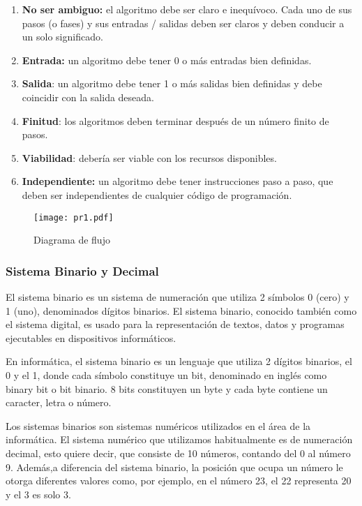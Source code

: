\begin{enumerate}
    \item \textbf{No ser ambiguo:} el algoritmo debe ser claro e inequívoco. Cada uno de sus pasos (o fases) y sus entradas / salidas deben ser claros y deben conducir a un solo significado.

    \item \textbf{Entrada:} un algoritmo debe tener 0 o más entradas bien definidas.

    \item \textbf{Salida}: un algoritmo debe tener 1 o más salidas bien definidas y debe coincidir con la salida deseada.

    \item \textbf{Finitud}: los algoritmos deben terminar después de un número finito de pasos.

    \item \textbf{Viabilidad}: debería ser viable con los recursos disponibles.

    \item \textbf{Independiente:} un algoritmo debe tener instrucciones paso a paso, que deben ser independientes de cualquier código de programación.
\end{enumerate}

\begin{figure}[h!]
\centering
  \texttt{[image: pr1.pdf]}
  \caption{Diagrama de flujo}
\end{figure}

\subsubsection{Sistema Binario y Decimal}

El sistema binario es un sistema de numeración que utiliza 2 símbolos 0 (cero) y 1 (uno), denominados dígitos binarios. El sistema binario, conocido también como el sistema digital, es usado para la representación de textos, datos y programas ejecutables en dispositivos informáticos.

En informática, el sistema binario es un lenguaje que utiliza 2 dígitos binarios, el 0 y el 1, donde cada símbolo constituye un bit, denominado en inglés como binary bit o bit binario. 8 bits constituyen un byte y cada byte contiene un caracter, letra o número.

Los sistemas binarios son sistemas numéricos utilizados en el área de la informática. El sistema numérico que utilizamos habitualmente es de numeración decimal, esto quiere decir, que consiste de 10 números, contando del 0 al número 9. Además,a diferencia del sistema binario, la posición que ocupa un número le otorga diferentes valores como, por ejemplo, en el número 23, el 22 representa 20 y el 3 es solo 3.

